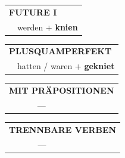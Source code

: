 \documentclass[10pt,a4paper]{revtex4-2}
\begin{document}
\begin{verbbox}
\begin{tabular}{rl}
    \multicolumn{2}{l}{\textbf{FUTURE I} }\\
   & werden + \textbf{knien}\\
 
  \end{tabular}
\hfill
   \begin{tabular}{rl}
      \multicolumn{2}{l}{\textbf{PLUSQUAMPERFEKT}}\\
   & hatten / waren + \textbf{gekniet}\\
  \end{tabular}
  
  \vspace{10pt}



\begin{tabular}{lll}
\multicolumn{3}{l}{\textbf{MIT PRÄPOSITIONEN}}\\
& ---\\
\end{tabular}
\hfill
\begin{tabular}{lll}
\multicolumn{3}{l}{\textbf{TRENNBARE VERBEN}}\\
& ---\\
\end{tabular}

  \vspace{-5pt}

\end{verbbox}
\end{document}
